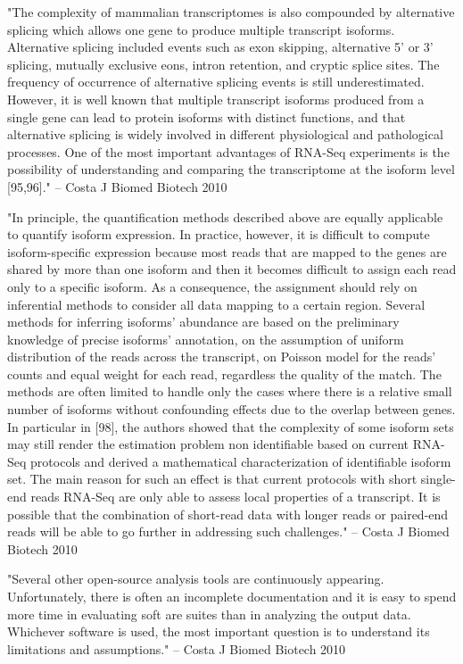 \documentclass[10pt]{article}
\begin{document}
"The complexity of mammalian transcriptomes is also compounded by alternative splicing which allows one gene to produce multiple transcript isoforms.  Alternative splicing included events such as exon skipping, alternative 5' or 3' splicing, mutually exclusive eons, intron retention, and cryptic splice sites.  The frequency of occurrence of alternative splicing events is still underestimated.  However, it is well known that multiple transcript isoforms produced from a single gene can lead to protein isoforms with distinct functions, and that alternative splicing is widely involved in different physiological and pathological processes.  One of the most important advantages of RNA-Seq experiments is the possibility of understanding and comparing the transcriptome at the isoform level [95,96]." -- Costa J Biomed Biotech 2010

"In principle, the quantification methods described above are equally applicable to quantify isoform expression.  In practice, however, it is difficult to compute isoform-specific expression because most reads that are mapped to the genes are shared by more than one isoform and then it becomes difficult to assign each read only to a specific isoform.  As a consequence, the assignment should rely on inferential methods to consider all data mapping to a certain region.  Several methods for inferring isoforms' abundance are based on the preliminary knowledge of precise isoforms' annotation, on the assumption of uniform distribution of the reads across the transcript, on Poisson model for the reads' counts and equal weight for each read, regardless the quality of the match.  The methods are often limited to handle only the cases where there is a relative small number of isoforms without confounding effects due to the overlap between genes.  In particular in [98], the authors showed that the complexity of some isoform sets may still render the estimation problem non identifiable based on current RNA-Seq protocols and derived a mathematical characterization of identifiable isoform set.  The main reason for such an effect is that current protocols with short single-end reads RNA-Seq are only able to assess local properties of a transcript.  It is possible that the combination of short-read data with longer reads or paired-end reads will be able to go further in addressing such challenges." -- Costa J Biomed Biotech 2010

"Several other open-source analysis tools are continuously appearing.  Unfortunately, there is often an incomplete documentation and it is easy to spend more time in evaluating soft are suites than in analyzing the output data.  Whichever software is used, the most important question is to understand its limitations and assumptions."  -- Costa J Biomed Biotech 2010
\end{document}
